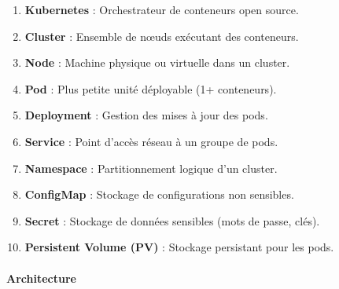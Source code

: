 \documentclass[
  letterpaper,
  DIV=11,
  numbers=noendperiod]{scrartcl}
\makeatletter
\let\oldparagraph\paragraph
\renewcommand{\paragraph}{
    \@ifstar
      \xxxParagraphStar
      \xxxParagraphNoStar
  }
\newcommand{\xxxParagraphStar}[1]{\oldparagraph*{#1}\mbox{}}
\newcommand{\xxxParagraphNoStar}[1]{\oldparagraph{#1}\mbox{}}
\providecommand{\tightlist}{%
  \setlength{\itemsep}{0pt}\setlength{\parskip}{0pt}}\usepackage{longtable,booktabs,array}
\makeatother
\begin{document}
\begin{enumerate}
\def\labelenumi{\arabic{enumi}.}
\tightlist
\item
  \textbf{Kubernetes} : Orchestrateur de conteneurs open source.\\
\item
  \textbf{Cluster} : Ensemble de nœuds exécutant des conteneurs.\\
\item
  \textbf{Node} : Machine physique ou virtuelle dans un cluster.\\
\item
  \textbf{Pod} : Plus petite unité déployable (1+ conteneurs).\\
\item
  \textbf{Deployment} : Gestion des mises à jour des pods.\\
\item
  \textbf{Service} : Point d'accès réseau à un groupe de pods.\\
\item
  \textbf{Namespace} : Partitionnement logique d'un cluster.\\
\item
  \textbf{ConfigMap} : Stockage de configurations non sensibles.\\
\item
  \textbf{Secret} : Stockage de données sensibles (mots de passe,
  clés).\\
\item
  \textbf{Persistent Volume (PV)} : Stockage persistant pour les pods.
\end{enumerate}

\paragraph{\texorpdfstring{\textbf{Architecture}}{Architecture}}\label{architecture}
\end{document}
